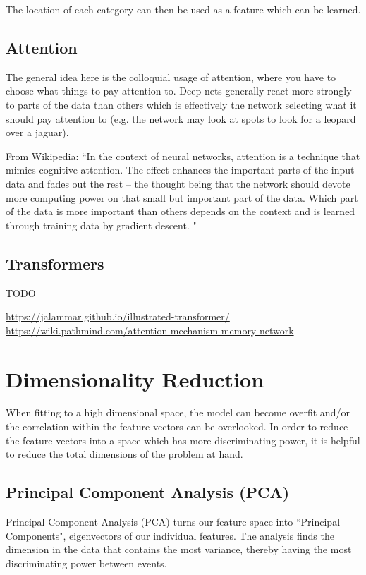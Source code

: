 The location of each category can then be used as a feature which can be learned.

\subsection{Attention}

The general idea here is the colloquial usage of attention, where you have to choose what things to pay attention to. Deep nets generally react more strongly to parts of the data than others which is effectively the network selecting what it should pay attention to (e.g. the network may look at spots to look for a leopard over a jaguar).



From Wikipedia: ``In the context of neural networks, attention is a technique that mimics cognitive attention. The effect enhances the important parts of the input data and fades out the rest -- the thought being that the network should devote more computing power on that small but important part of the data. Which part of the data is more important than others depends on the context and is learned through training data by gradient descent. "


\subsection{Transformers}
TODO

\url{https://jalammar.github.io/illustrated-transformer/}\\
\url{https://wiki.pathmind.com/attention-mechanism-memory-network}

\section{Dimensionality Reduction}\label{dim_red}
When fitting to a high dimensional space, the model can become overfit and/or the correlation within the feature vectors can be overlooked. In order to reduce the feature vectors into a space which has more discriminating power, it is helpful to reduce the total dimensions of the problem at hand.
\subsection{Principal Component Analysis (PCA)}
Principal Component Analysis (PCA) turns our feature space into ``Principal Components", eigenvectors of our individual features. The analysis finds the dimension in the data that contains the most variance, thereby having the most discriminating power between events.

